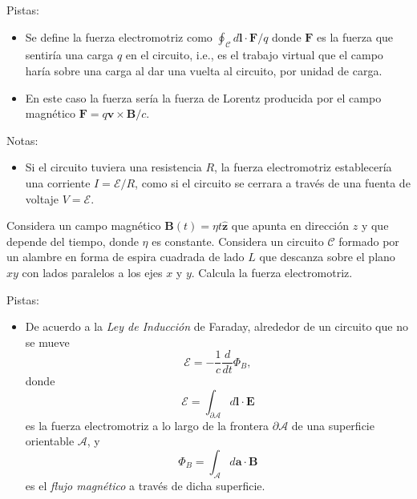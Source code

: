 \documentclass{exam}
\begin{document}
\begin{questions}
  Pistas:
  \begin{itemize}
  \item Se define la fuerza electromotriz como $\oint_{\mathcal C}d\bm
    l\cdot \bm F/q$ donde $\bm  F$ es la fuerza que sentiría una carga $q$
    en el circuito, i.e., es el trabajo virtual que el campo haría
    sobre una carga al dar una vuelta al circuito, por unidad de carga.
  \item En este caso la fuerza sería la fuerza de Lorentz producida
    por el campo magnético $\bm F=q\bm v\times \bm B/c$.
  \end{itemize}
  Notas:
  \begin{itemize}
  \item Si el circuito tuviera una resistencia $R$, la fuerza
    electromotriz establecería una corriente $I=\mathcal E/R$, como si
    el circuito se cerrara a través de una fuenta de voltaje
    $V=\mathcal E$.
  \end{itemize}

  \question Considera un campo magnético $\bm B(t)=\eta t\hat{\bm
    z}$ que apunta en dirección $z$ y que depende del
  tiempo, donde $\eta$ es constante. Considera un circuito $\mathcal C$ formado
  por un alambre en forma de espira cuadrada de lado $L$ que descanza
  sobre el plano $xy$ con lados paralelos a los ejes $x$ y
  $y$. Calcula la fuerza electromotriz.

  Pistas:
  \begin{itemize}
  \item De acuerdo a la {\em Ley de Inducción} de Faraday, alrededor
    de un circuito que no se mueve
    $$\mathcal E=-\frac{1}{c}\frac{d}{dt}\Phi_B,$$
    donde
    $$\mathcal E=\int_{\partial \mathcal A} d\bm l\cdot\bm E$$
    es la fuerza electromotriz a lo largo de la frontera
    $\partial\mathcal A$ de una superficie orientable $\mathcal A$, y
    $$\Phi_B=\int_{\mathcal A}d\bm a\cdot\bm B$$
    es el {\em flujo magnético} a través de dicha superficie.
  \end{itemize}


\end{questions}
\end{document}

